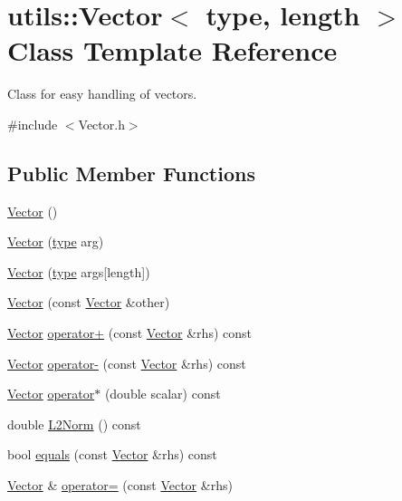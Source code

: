 \hypertarget{classutils_1_1Vector}{\section{utils\-:\-:Vector$<$ type, length $>$ Class Template Reference}
\label{classutils_1_1Vector}
}


Class for easy handling of vectors.  




{\ttfamily \#include $<$Vector.\-h$>$}

\subsection*{Public Member Functions}
\begin{DoxyCompactItemize}
\item 
\hyperlink{classutils_1_1Vector_a71b42b489a54eb7eae82cff54fae0e12}{Vector} ()
\item 
\hyperlink{classutils_1_1Vector_a5f7d3385f6db28e1376d16e46f1a485f}{Vector} (\hyperlink{classtype}{type} arg)
\item 
\hyperlink{classutils_1_1Vector_a61a6f07c23829b70273ab4578bbb2332}{Vector} (\hyperlink{classtype}{type} args\mbox{[}length\mbox{]})
\item 
\hyperlink{classutils_1_1Vector_abb684db142444c4b19e6cd854db1a0d8}{Vector} (const \hyperlink{classutils_1_1Vector}{Vector} \&other)
\item 
\hyperlink{classutils_1_1Vector}{Vector} \hyperlink{classutils_1_1Vector_aeb0edeaa6b74a48839892e16623b0949}{operator+} (const \hyperlink{classutils_1_1Vector}{Vector} \&rhs) const 
\item 
\hyperlink{classutils_1_1Vector}{Vector} \hyperlink{classutils_1_1Vector_ad6e42a80810a58993f39e1d876eb5716}{operator-\/} (const \hyperlink{classutils_1_1Vector}{Vector} \&rhs) const 
\item 
\hyperlink{classutils_1_1Vector}{Vector} \hyperlink{classutils_1_1Vector_a655ed48c281bfb1c87901313eb1896bb}{operator$\ast$} (double scalar) const 
\item 
double \hyperlink{classutils_1_1Vector_aa54009b6a76a8059de0eccbe43524d0c}{L2\-Norm} () const 
\item 
bool \hyperlink{classutils_1_1Vector_a761ff3d4c09a533535452b2a20038782}{equals} (const \hyperlink{classutils_1_1Vector}{Vector} \&rhs) const 
\item 
\hyperlink{classutils_1_1Vector}{Vector} \& \hyperlink{classutils_1_1Vector_a16812f2bf90d9e79b58fd42860c111e7}{operator=} (const \hyperlink{classutils_1_1Vector}{Vector} \&rhs)

\end{DoxyCompactItemize}
